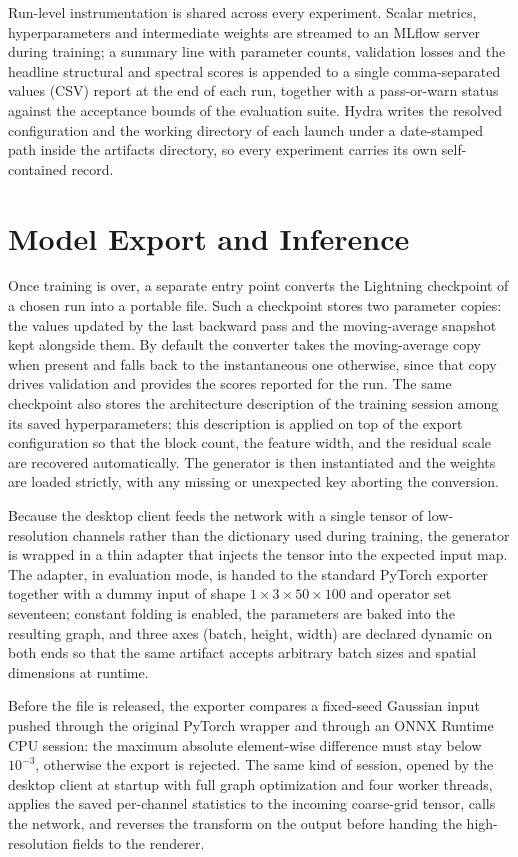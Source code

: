 Run-level instrumentation is shared across every experiment. Scalar metrics, hyperparameters and intermediate weights are streamed to an MLflow server during training; a summary line with parameter counts, validation losses and the headline structural and spectral scores is appended to a single comma-separated values (CSV) report at the end of each run, together with a pass-or-warn status against the acceptance bounds of the evaluation suite. Hydra writes the resolved configuration and the working directory of each launch under a date-stamped path inside the artifacts directory, so every experiment carries its own self-contained record.

\section{Model Export and Inference}
\label{subsec:impl_export}

Once training is over, a separate entry point converts the Lightning checkpoint of a chosen run into a portable file. Such a checkpoint stores two parameter copies: the values updated by the last backward pass and the moving-average snapshot kept alongside them. By default the converter takes the moving-average copy when present and falls back to the instantaneous one otherwise, since that copy drives validation and provides the scores reported for the run. The same checkpoint also stores the architecture description of the training session among its saved hyperparameters; this description is applied on top of the export configuration so that the block count, the feature width, and the residual scale are recovered automatically. The generator is then instantiated and the weights are loaded strictly, with any missing or unexpected key aborting the conversion.

Because the desktop client feeds the network with a single tensor of low-resolution channels rather than the dictionary used during training, the generator is wrapped in a thin adapter that injects the tensor into the expected input map. The adapter, in evaluation mode, is handed to the standard PyTorch exporter together with a dummy input of shape $1 \times 3 \times 50 \times 100$ and operator set seventeen; constant folding is enabled, the parameters are baked into the resulting graph, and three axes (batch, height, width) are declared dynamic on both ends so that the same artifact accepts arbitrary batch sizes and spatial dimensions at runtime.

Before the file is released, the exporter compares a fixed-seed Gaussian input pushed through the original PyTorch wrapper and through an ONNX Runtime CPU session: the maximum absolute element-wise difference must stay below $10^{-3}$, otherwise the export is rejected. The same kind of session, opened by the desktop client at startup with full graph optimization and four worker threads, applies the saved per-channel statistics to the incoming coarse-grid tensor, calls the network, and reverses the transform on the output before handing the high-resolution fields to the renderer.